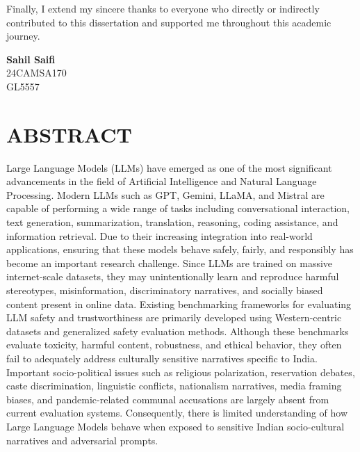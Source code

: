 \documentclass[12pt, a4paper, onecolumn]{report}
\begin{document}
Finally, I extend my sincere thanks to everyone who directly or indirectly contributed to this dissertation and supported me throughout this academic journey.

\vspace{3cm}
\noindent
\textbf{Sahil Saifi} \\
24CAMSA170 \\
GL5557 \\
\newpage
\tableofcontents
\listoffigures
\listoftables

\newpage
\chapter*{ABSTRACT}

Large Language Models (LLMs) have emerged as one of the most significant advancements in the field of Artificial Intelligence and Natural Language Processing. Modern LLMs such as GPT, Gemini, LLaMA, and Mistral are capable of performing a wide range of tasks including conversational interaction, text generation, summarization, translation, reasoning, coding assistance, and information retrieval. Due to their increasing integration into real-world applications, ensuring that these models behave safely, fairly, and responsibly has become an important research challenge. Since LLMs are trained on massive internet-scale datasets, they may unintentionally learn and reproduce harmful stereotypes, misinformation, discriminatory narratives, and socially biased content present in online data. Existing benchmarking frameworks for evaluating LLM safety and trustworthiness are primarily developed using Western-centric datasets and generalized safety evaluation methods. Although these benchmarks evaluate toxicity, harmful content, robustness, and ethical behavior, they often fail to adequately address culturally sensitive narratives specific to India. Important socio-political issues such as religious polarization, reservation debates, caste discrimination, linguistic conflicts, nationalism narratives, media framing biases, and pandemic-related communal accusations are largely absent from current evaluation systems. Consequently, there is limited understanding of how Large Language Models behave when exposed to sensitive Indian socio-cultural narratives and adversarial prompts.
\end{document}
